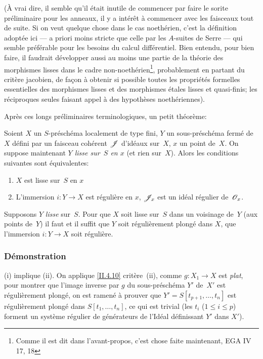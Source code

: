 \begin{remarques}
(\`A vrai dire, il semble qu'il \'etait inutile de commencer par
faire le sorite pr\'eliminaire pour les anneaux, il y a
int\'er\^et \`a commencer avec les faisceaux tout de suite. Si
on veut quelque chose dans le cas noeth\'erien, c'est la
d\'efinition adopt\'ee ici --- a priori moins stricte que celle par
les $A$-suites de Serre --- qui semble pr\'ef\'erable pour les
besoins du calcul diff\'erentiel. Bien entendu, pour bien faire, il
faudrait d\'evelopper aussi au moins une partie de la th\'eorie
des morphismes lisses dans le cadre non-noeth\'erien\footnote{Comme
il est dit dans l'avant-propos, c'est chose faite maintenant, \cf EGA
IV 17, 18}, probablement en
partant du crit\`ere jacobien, de fa\c con \`a obtenir si
possible toutes les propri\'et\'es formelles essentielles des
morphismes lisses et des morphismes \'etales \ie lisses et
quasi-finis; les r\'eciproques seules faisant appel \`a des
hypoth\`eses noeth\'eriennes).
\end{remarques}

Apr\`es ces longs pr\'eliminaires terminologiques, un petit
th\'eor\`eme:
\begin{theoreme}
\label{II.4.15}
Soient $X$ un $S$-pr\'esch\'ema localement de type fini, $Y$ un
sous-pr\'esch\'ema ferm\'e de~$X$ d\'efini par un faisceau
coh\'erent $\cal{J}$ d'id\'eaux sur~$X$, $x$ un point de~$X$. On
suppose maintenant \emph{$Y$ lisse sur~$S$ en $x$} (et rien sur~$X$). Alors les conditions suivantes sont \'equivalentes:
\begin{enumerate}
\item[(i)] $X$ est lisse sur~$S$ en $x$
\item[(ii)] L'immersion $i\colon Y \to X$ est r\'eguli\`ere en
$x$, \ie $\cal{J}_x$ est un id\'eal r\'egulier de~$\cal{O}_x$.
\end{enumerate}
\end{theoreme}

\begin{corollaire}
\label{II.4.16}
Supposons $Y$ \emph{lisse} sur~$S$. Pour que $X$ soit lisse sur~$S$
dans un voisinage de~$Y$ (\ie aux points de~$Y$) il faut et il suffit
que $Y$ soit r\'eguli\`erement plong\'e dans $X$, \ie que
l'immersion $i \colon Y \to X$ soit r\'eguli\`ere.
\end{corollaire}

\subsubsection*{D\'emonstration}
(i) implique (ii). On applique \ref{II.4.10} crit\`ere~(ii), comme
$g\colon X_1 \to X$ est \emph{plat}, pour montrer que l'image inverse
par $g$ du sous-pr\'esch\'ema $Y'$ de~$X'$ est
r\'eguli\`erement plong\'e, on est ramen\'e \`a prouver que
$Y'=S[t_{p+1},\dots, t_n]$ est r\'eguli\`erement plong\'e dans
$S[t_1,\dots,t_n]$, ce qui est trivial (les $t_i$ ($1 \leq i \leq
p$) forment un syst\`eme r\'egulier de g\'en\'erateurs de
l'Id\'eal d\'efinissant $Y'$ dans $X'$).

